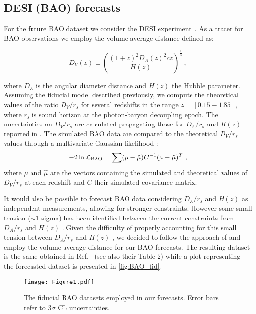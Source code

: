 \documentclass[fleqn,usenatbib,letters]{mnras}
\begin{document}
\subsection{DESI (BAO) forecasts}
For the future BAO dataset we consider the DESI experiment~\citep{DESI:2013agm}. As a tracer for BAO observations we employ the volume average distance defined as:

\begin{equation}
D_V(z)\equiv \left(\frac{(1+z)^2D_A(z)^2cz}{H(z)}\right)^\frac{1}{3}~,
\end{equation}

\noindent where $D_A$ is the angular diameter distance and $H(z)$ the Hubble parameter.
Assuming the fiducial model described previously, we compute the theoretical values of the ratio $D_V/r_s$ for several redshifts in the range $z=[0.15-1.85]$, where $r_s$ is sound horizon at the photon-baryon decoupling epoch. The uncertainties on $D_V/r_s$ are calculated propagating those for $D_A/r_s$ and $H(z)$ reported in \citep{DESI}. 
The simulated BAO data are compared to the theoretical $D_V/r_s$ values through a multivariate Gaussian likelihood :
\begin{equation}
    -2\ln \mathcal{L}_{\rm BAO} = \sum (\mathbf{\mu} - \hat{\mathbf{\mu}})C^{-1}(\mathbf{\mu} - \hat{\mathbf{\mu}})^T ~,
\end{equation}
where $\mu$ and $\hat{\mu}$ are the vectors containing the simulated and theoretical values of $D_V/r_s$ at each redshift and $C$ their simulated covariance matrix. 

It would also be possible to forecast BAO data considering $D_A/r_s$ and $H(z)$ as independent measurements, allowing for stronger constraints. However some small tension ($\sim 1$ sigma) has been identified between the current constraints from $D_A/r_s$ and $H(z)$ \citep{Addison:2017fdm}. Given the difficulty of properly accounting for this small tension between $D_A/r_s$ and $H(z)$ , we decided to follow the approach of \citep{Allison:2015qca} and employ the volume average distance for our BAO forecasts. The resulting dataset is the same obtained in Ref.~\citep{DiValentino:2018jbh} (see also their Table 2) while a plot representing the forecasted dataset is presented in \autoref{fig:BAO_fid}.

\begin{figure}
    \centering
    \texttt{[image: Figure1.pdf]}
\caption{The fiducial BAO datasets employed in our forecasts. Error bars refer to $3\sigma$ CL uncertainties.}
\label{fig:BAO_fid}
\end{figure}
\end{document}
